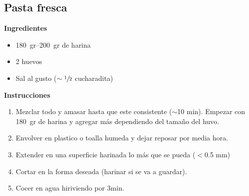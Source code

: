 \subsection{Pasta fresca}
\textbf{Ingredientes}
\begin{itemize}
\item \SIrange{180}{200}{gr} de harina
\item 2 huevos
\item Sal al gusto ($\sim \sfrac{1}{2}$ cucharadita)
\end{itemize}

\textbf{Instrucciones}
\begin{enumerate}
\item Mezclar todo y amasar hasta que este consistente ($\sim$10 min). Empezar con \SI{180}{gr} de harina y agregar más dependiendo del tamaño del huvo.
\item Envolver en plastico o toalla humeda y dejar reposar por media hora.
\item Extender en una superficie harinada lo m\'as que se pueda ($<$0.5 mm)
\item Cortar en la forma deseada (harinar si se va a guardar).
\item Cocer en agua hiriviendo por 3min.
\end{enumerate}
